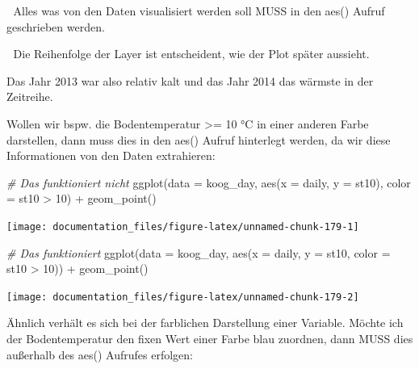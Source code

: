 \documentclass[
]{article}
\newenvironment{Shaded}{\begin{snugshade}}{\end{snugshade}}
\newcommand{\AttributeTok}[1]{\textcolor[rgb]{0.77,0.63,0.00}{#1}}
\newcommand{\CommentTok}[1]{\textcolor[rgb]{0.56,0.35,0.01}{\textit{#1}}}
\newcommand{\DecValTok}[1]{\textcolor[rgb]{0.00,0.00,0.81}{#1}}
\newcommand{\FunctionTok}[1]{\textcolor[rgb]{0.00,0.00,0.00}{#1}}
\newcommand{\NormalTok}[1]{#1}
\newcommand{\SpecialCharTok}[1]{\textcolor[rgb]{0.00,0.00,0.00}{#1}}
\begin{document}
🚨 Alles was von den Daten visualisiert werden soll MUSS in den aes() Aufruf geschrieben werden.

🚨 Die Reihenfolge der Layer ist entscheident, wie der Plot später aussieht.

Das Jahr 2013 war also relativ kalt und das Jahr 2014 das wärmste in der Zeitreihe.

Wollen wir bspw. die Bodentemperatur \textgreater= 10 °C in einer anderen Farbe darstellen, dann muss dies in den aes() Aufruf hinterlegt werden, da wir diese Informationen von den Daten extrahieren:

\begin{Shaded}
\begin{Highlighting}[]
\CommentTok{\# Das funktioniert nicht}
\FunctionTok{ggplot}\NormalTok{(}\AttributeTok{data =}\NormalTok{ koog\_day, }\FunctionTok{aes}\NormalTok{(}\AttributeTok{x =}\NormalTok{ daily, }\AttributeTok{y =}\NormalTok{ st10), }\AttributeTok{color =}\NormalTok{ st10 }\SpecialCharTok{\textgreater{}} \DecValTok{10}\NormalTok{) }\SpecialCharTok{+}
  \FunctionTok{geom\_point}\NormalTok{()}
\end{Highlighting}
\end{Shaded}

\begin{center}\texttt{[image: documentation\_files/figure-latex/unnamed-chunk-179-1]} \end{center}

\begin{Shaded}
\begin{Highlighting}[]
\CommentTok{\# Das funktioniert}
\FunctionTok{ggplot}\NormalTok{(}\AttributeTok{data =}\NormalTok{ koog\_day, }\FunctionTok{aes}\NormalTok{(}\AttributeTok{x =}\NormalTok{ daily, }\AttributeTok{y =}\NormalTok{ st10, }\AttributeTok{color =}\NormalTok{ st10 }\SpecialCharTok{\textgreater{}} \DecValTok{10}\NormalTok{)) }\SpecialCharTok{+}
  \FunctionTok{geom\_point}\NormalTok{()}
\end{Highlighting}
\end{Shaded}

\begin{center}\texttt{[image: documentation\_files/figure-latex/unnamed-chunk-179-2]} \end{center}

Ähnlich verhält es sich bei der farblichen Darstellung einer Variable. Möchte ich der Bodentemperatur den fixen Wert einer Farbe blau zuordnen, dann MUSS dies außerhalb des aes() Aufrufes erfolgen:
\end{document}
